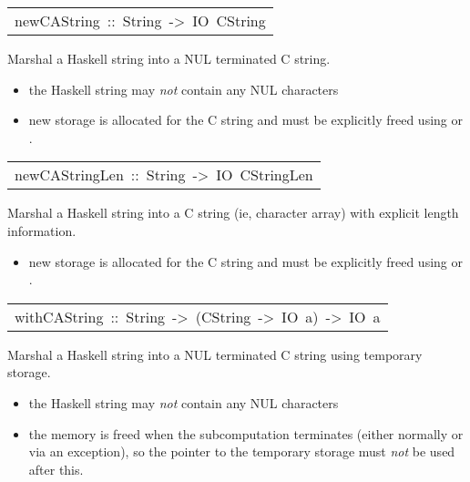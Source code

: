 \begin{haddockdesc}
\item[\begin{tabular}{@{}l}
newCAString\ ::\ String\ ->\ IO\ CString
\end{tabular}]\haddockbegindoc
Marshal a Haskell string into a NUL terminated C string.
\par
\begin{itemize}
\item
 the Haskell string may \emph{not} contain any NUL characters
\par

\item
 new storage is allocated for the C string and must be
   explicitly freed using  or
   .
\par

\end{itemize}

\end{haddockdesc}
\begin{haddockdesc}
\item[\begin{tabular}{@{}l}
newCAStringLen\ ::\ String\ ->\ IO\ CStringLen
\end{tabular}]\haddockbegindoc
Marshal a Haskell string into a C string (ie, character array) with
 explicit length information.
\par
\begin{itemize}
\item
 new storage is allocated for the C string and must be
   explicitly freed using  or
   .
\par

\end{itemize}

\end{haddockdesc}
\begin{haddockdesc}
\item[\begin{tabular}{@{}l}
withCAString\ ::\ String\ ->\ (CString\ ->\ IO\ a)\ ->\ IO\ a
\end{tabular}]\haddockbegindoc
Marshal a Haskell string into a NUL terminated C string using temporary
 storage.
\par
\begin{itemize}
\item
 the Haskell string may \emph{not} contain any NUL characters
\par

\item
 the memory is freed when the subcomputation terminates (either
   normally or via an exception), so the pointer to the temporary
   storage must \emph{not} be used after this.
\par

\end{itemize}

\end{haddockdesc}
